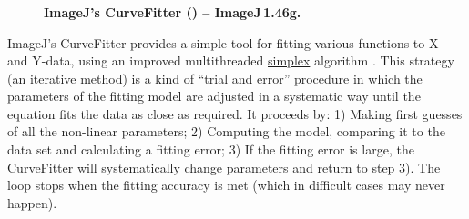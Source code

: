 

\subsubsection[\protect\userinterface{Curve Fitting\ldots{}}]{\protect{}\label{sub:Curve-Fitting...}}

\begin{figure}[h]
\caption[CurveFitter]{\textbf{\label{fig:CurveFitter}ImageJ's CurveFitter (\protect{})
-- ImageJ\,1.46g.}}
\end{figure}
ImageJ's CurveFitter provides a simple tool for fitting various functions
to X- and Y-data, using an improved multithreaded \href{http://en.wikipedia.org/wiki/Simplex}{simplex}
algorithm {\small \cite{C-CurveFitter}}. This strategy (an \href{http://en.wikipedia.org/wiki/Iterative_method}{iterative method})
is a kind of ``trial and error'' procedure in which the parameters
of the fitting model are adjusted in a systematic way until the equation
fits the data as close as required. It proceeds by: 1) Making first
guesses of all the non-linear parameters; 2) Computing the model,
comparing it to the data set and calculating a fitting error; 3) If
the fitting error is large, the CurveFitter will systematically change
parameters and return to step 3). The loop stops when the fitting
accuracy is met (which in difficult cases may never happen). 

